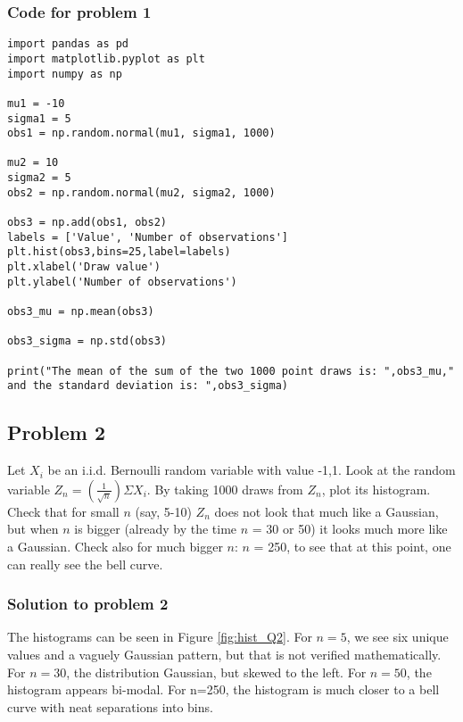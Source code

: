 \documentclass[12pt]{article}%
\begin{document}
\subsubsection{Code for problem 1}
\begin{lstlisting}
import pandas as pd
import matplotlib.pyplot as plt
import numpy as np

mu1 = -10
sigma1 = 5
obs1 = np.random.normal(mu1, sigma1, 1000)

mu2 = 10
sigma2 = 5
obs2 = np.random.normal(mu2, sigma2, 1000)

obs3 = np.add(obs1, obs2)
labels = ['Value', 'Number of observations']
plt.hist(obs3,bins=25,label=labels)
plt.xlabel('Draw value')
plt.ylabel('Number of observations')

obs3_mu = np.mean(obs3)

obs3_sigma = np.std(obs3)

print("The mean of the sum of the two 1000 point draws is: ",obs3_mu,"
and the standard deviation is: ",obs3_sigma)
\end{lstlisting}


\subsection{Problem 2}

Let $X_i$ be an i.i.d. Bernoulli random variable with value {-1,1}. Look at the random variable $Z_n = (\frac{1}{\sqrt{n}})\Sigma X_i$. By taking 1000 draws from $Z_n$, plot its histogram. Check that for small $n$ (say, 5-10) $Z_n$ does not look that much like a Gaussian, but when $n$ is bigger (already by the time $n$ = 30 or 50) it looks much more like a Gaussian. Check also for much bigger $n$: $n$ = 250, to see that at this point, one can really see the bell curve.\\


\subsubsection{Solution to problem 2}

The histograms can be seen in Figure \ref{fig:hist_Q2}. For $n=5$, we see six unique values and a vaguely Gaussian pattern, but that is not verified mathematically. For $n=30$, the distribution Gaussian, but skewed to the left. For $n=50$, the histogram appears bi-modal. For n=250, the histogram is much closer to a bell curve with neat separations into bins. \\
\end{document}
